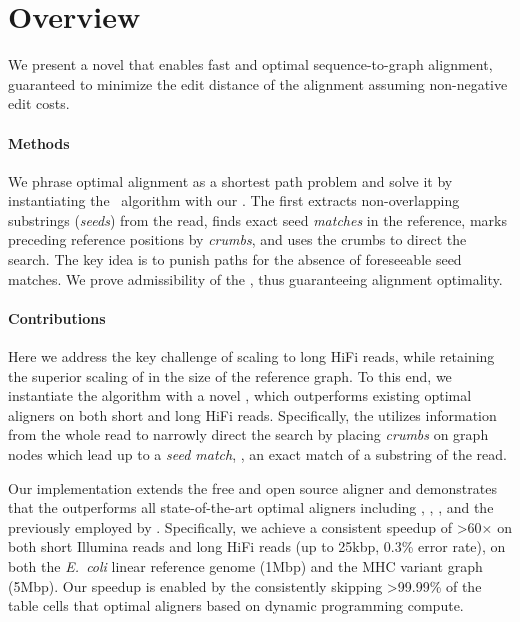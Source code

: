 \section{Overview}

We present a novel \A \emph{\seedh} that enables fast and optimal
sequence-to-graph alignment, guaranteed to minimize the edit distance of the
alignment assuming non-negative edit costs.

\paragraph{Methods}
We phrase optimal alignment as a shortest path problem and solve it by
instantiating the \A~algorithm with our \seedh. The \seedh first extracts
non-overlapping substrings (\emph{seeds}) from the read, finds exact seed
\emph{matches} in the reference, marks preceding reference positions by
\emph{crumbs}, and uses the crumbs to direct the \A search. The key idea is to
punish paths for the absence of foreseeable seed matches. We prove admissibility
of the \seedh, thus guaranteeing alignment optimality.

\paragraph{Contributions}
Here we address the key challenge of scaling to long HiFi reads, while retaining
the superior scaling of \astarix in the size of the reference graph. To this
end, we instantiate the \A algorithm with a novel \seedh, which outperforms
existing optimal aligners on both short and long HiFi reads. Specifically, the
\seedh utilizes information from the whole read to narrowly direct the \A search
by placing \emph{crumbs} on graph nodes which lead up to a \emph{seed match},
\ie, an exact match of a substring of the read.

Our implementation extends the free and open source aligner and demonstrates
that the \seedh outperforms all state-of-the-art optimal aligners including
\graphaligner, \vargas, \pasgal, and the \prefixh previously employed by
\astarix. Specifically, we achieve a consistent speedup of >60$\times$ on both
short Illumina reads and long HiFi reads (up to 25kbp, 0.3\% error rate), on
both the \textit{E.~coli} linear reference genome (1Mbp) and the MHC variant
graph (5Mbp). Our speedup is enabled by the \seedh consistently skipping
>99.99\% of the table cells that optimal aligners based on dynamic programming
compute.

